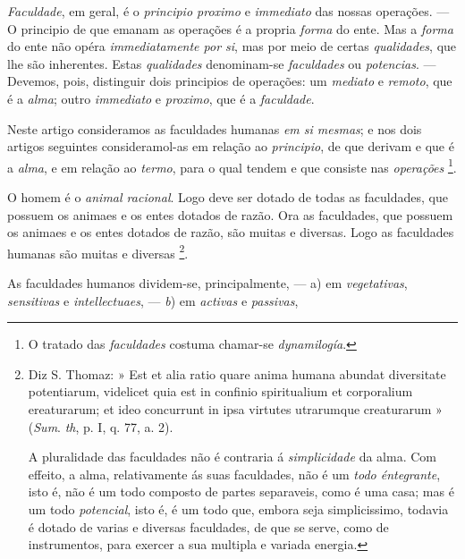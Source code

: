 
\emph{Faculdade}, em geral, é o \emph{principio proximo} e \emph{immediato} das nossas operações. --- O principio de que emanam as operações é a propria \emph{forma} do ente. Mas a \emph{forma} do ente não opéra \emph{immediatamente por si}, mas por meio de certas \emph{qualidades}, que lhe são inherentes. Estas \emph{qualidades} denominam-se \emph{faculdades} ou \emph{potencias}. --- Devemos, pois, distinguir dois principios de operações: um \emph{mediato} e \emph{remoto}, que é a \emph{alma}; outro \emph{immediato} e \emph{proximo}, que é a \emph{faculdade}.

Neste artigo consideramos as faculdades humanas \emph{em si mesmas}; e nos dois artigos seguintes consideramol-as em relação ao \emph{principio}, de que derivam e que é a \emph{alma}, e em relação ao \emph{termo}, para o qual tendem e que consiste nas \emph{operações} \footnote{O tratado das \emph{faculdades} costuma chamar-se \emph{dynamilogía}.}.


 
O homem é o \emph{animal racional}. Logo deve ser dotado de todas as faculdades, que possuem os animaes e os entes dotados de razão. Ora as faculdades, que possuem os animaes e os entes dotados de razão, são muitas e diversas. Logo as faculdades humanas são muitas e diversas \footnote{Diz S. Thomaz: » Est et alia ratio quare anima humana abundat diversitate potentiarum, videlicet quia est in confinio spiritualium et corporalium ereaturarum; et ideo concurrunt in ipsa virtutes utrarumque creaturarum » (\emph{Sum}. \emph{th}, p. I, q. 77, a. 2).\par A pluralidade das faculdades não é contraria á \emph{simplicidade} da alma. Com effeito, a alma, relativamente ás suas faculdades, não é um \emph{todo éntegrante}, isto é, não é um todo composto de partes separaveis, como é uma casa; mas é um todo \emph{potencial}, isto é, é um todo que, embora seja simplicissimo, todavia é dotado de varias e diversas faculdades, de que se serve, como de instrumentos, para exercer a sua multipla e variada energia.}.


As faculdades humanos dividem-se, principalmente, --- a) em \emph{vegetativas}, \emph{sensitivas} e \emph{intellectuaes}, --- \emph{b}) em \emph{activas} e \emph{passivas},


